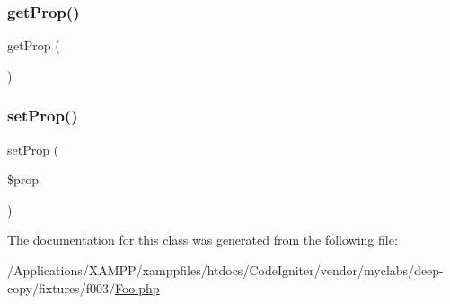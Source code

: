 \subsubsection{\texorpdfstring{get\+Prop()}{getProp()}}
{\footnotesize\ttfamily get\+Prop (\begin{DoxyParamCaption}{ }\end{DoxyParamCaption})}

\mbox{\label{class_deep_copy_1_1f003_1_1_foo_ad786bae4ca9ec5a5e51b6b95a1700343}} 
\subsubsection{\texorpdfstring{set\+Prop()}{setProp()}}
{\footnotesize\ttfamily set\+Prop (\begin{DoxyParamCaption}\item[{}]{\$prop }\end{DoxyParamCaption})}



The documentation for this class was generated from the following file\+:\begin{DoxyCompactItemize}
\item 
/\+Applications/\+X\+A\+M\+P\+P/xamppfiles/htdocs/\+Code\+Igniter/vendor/myclabs/deep-\/copy/fixtures/f003/\mbox{\hyperlink{myclabs_2deep-copy_2fixtures_2f003_2_foo_8php}{Foo.\+php}}\end{DoxyCompactItemize}
